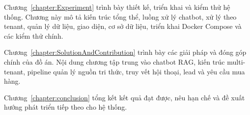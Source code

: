 \documentclass[../DoAn.tex]{subfiles}
\begin{document}
Chương~\ref{chapter:Experiment} trình bày thiết kế, triển khai và kiểm thử hệ thống. Chương này mô tả kiến trúc tổng thể, luồng xử lý chatbot, xử lý theo tenant, quản lý dữ liệu, giao diện, cơ sở dữ liệu, triển khai Docker Compose và các kiểm thử chính.

Chương~\ref{chapter:SolutionAndContribution} trình bày các giải pháp và đóng góp chính của đồ án. Nội dung chương tập trung vào chatbot RAG, kiến trúc multi-tenant, pipeline quản lý nguồn tri thức, truy vết hội thoại, lead và yêu cầu mua hàng.

Chương~\ref{chapter:conclusion} tổng kết kết quả đạt được, nêu hạn chế và đề xuất hướng phát triển tiếp theo cho hệ thống.
\end{document}
